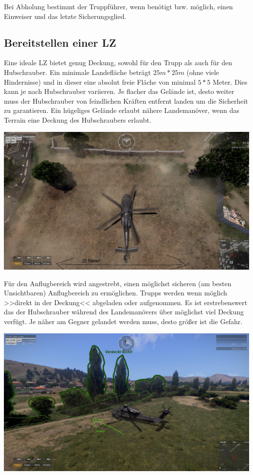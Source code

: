 	Bei Abholung bestimmt der Truppführer, wenn benötigt bzw. möglich, einen Einweiser und das letzte Sicherungsglied.

\subsection{Bereitstellen einer \acf{LZ}}
	Eine ideale \ac{LZ} bietet genug Deckung, sowohl für den Trupp als auch für den Hubschrauber. Ein minimale Landefläche beträgt $25m * 25m$ (ohne viele Hindernisse) und in dieser eine absolut freie Fläche von minimal $5 * 5$ Meter. Dies kann je nach Hubschrauber variieren. Je flacher das Gelände ist, desto weiter muss der Hubschrauber von feindlichen Kräften entfernt landen um die Sicherheit zu garantieren. Ein hügeliges Gelände erlaubt nähere Landemanöver, wenn das Terrain eine Deckung des Hubschraubers erlaubt. \\
	\begin{minipage}[t]{1\textwidth}
		\includegraphics[width=\textwidth]{./Grafiken/Hubschrauber/Landezone.jpg}
	\end{minipage}

	Für den Anflugbereich wird angestrebt, einen möglichst sicheren (am besten Unsichtbaren) Anflugbereich zu ermöglichen. Trupps werden wenn möglich >>direkt in der Deckung<< abgeladen oder aufgenommen. Es ist erstrebenswert das der Hubschrauber während des Landemanövers über möglichst viel Deckung verfügt. Je näher am Gegner gelandet werden muss, desto größer ist die Gefahr. \\
	\begin{minipage}[t]{1\textwidth}
		\includegraphics[width=\textwidth]{./Grafiken/Hubschrauber/verdeckteLandungamSammelpunktmitDeckung.jpg}
	\end{minipage}

